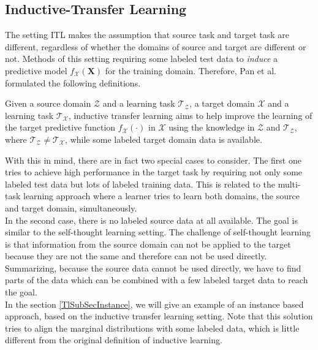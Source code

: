 \subsection{Inductive-Transfer Learning}\label{TlSubSecInduc}
The setting \ac{ITL} makes the assumption that source task and target task are different, regardless of whether the domains of source and target are different or not.
Methods of this setting requiring some labeled test data to \textit{induce} a predictive model $f_\mathcal{X}(\mathbf{X})$ for the training domain.\cite{Pan.2010}
Therefore, Pan et al. formulated the following definitions.
\begin{mDef}\label{DefITL}
	 Given a source domain $\mathcal{Z}$ and a learning task $\mathcal{T_Z}$, a target domain $\mathcal{X}$ and a learning task $\mathcal{T_X}$, inductive transfer learning aims to help improve the learning of the target predictive function $f_\mathcal{X}(\cdot)$ in $\mathcal{X}$ using the knowledge in $\mathcal{Z}$ and $\mathcal{T_Z}$, where $\mathcal{T_Z} \neq \mathcal{T_X}$, while some labeled target domain data is available.
\end{mDef} 
With this in mind, there are in fact two special cases to consider.
The first one tries to achieve high performance in the target task by requiring not only some labeled test data but lots of labeled training data.
This is related to the multi-task learning approach where a learner tries to learn both domains, the source and target domain,  simultaneously.\cite{Pan.2010}\\
In the second case, there is no labeled source data at all available.
The goal is similar to the self-thought learning setting.
The challenge of self-thought learning is that information from the source domain can not be applied to the target because they are not the same and therefore can not be used directly.
Summarizing, because the source data cannot be used directly, we have to find parts of the data which can be combined with a few labeled target data to reach the goal.\cite{Pan.2010}\\
In the section \ref{TlSubSecInstance}, we will give an example of an instance based approach, based on the inductive transfer learning setting.
Note that this solution tries to align the marginal distributions with some labeled data, which is little different from the original definition of inductive learning.

